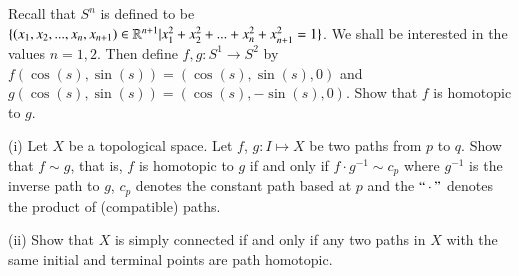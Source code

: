 \documentclass[12pt]{exam}
\theoremstyle{definition}
\newcommand{\R}{\mathcal{R}}
\def\R{{ \Bbb R}}
\begin{document}
\begin{questions}





\question

Recall that $S^n$ is defined to be $\{(x_1,x_2,...,x_n,x_{n+1}) \in
\R^{n+1} |x_1^2+x_2^2+...+x_n^2+x_{n+1}^2=1\}$. We shall be
interested in the values $n=1,2$. Then define $f,g: S^1 \rightarrow
S^2$ by $f(\cos(s),\sin(s))=(\cos(s),\sin(s),0)$ and
$g(\cos(s),\sin(s))=(\cos(s),-\sin(s),0)$. Show that $f$ is
homotopic to $g$.






\question

(i) Let $X$ be a topological space. Let $f$, $g:I \mapsto X$ be two paths from $p$ to $q$. Show that $f\sim g$,
that is, $f$ is homotopic to $g$ if and only if $f \cdot g^{-1} \sim c_p$ where  $g^{-1}$ is the inverse path to
$g$, $c_p$ denotes the constant path based at $p$ and the  $``\cdot"$ denotes the product of (compatible) paths.

(ii) Show that $X$ is simply connected if and only if any two paths in $X$ with the same initial and terminal
points are path homotopic.




\end{questions}
\end{document}
